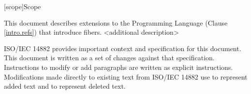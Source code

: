 
[scope]{Scope}

\pnum
This document describes extensions to the \Cpp
Programming Language (Clause \ref{intro.refs}) that introduce fibers.
<additional description>

\pnum
ISO/IEC 14882 provides important context
and specification for this document. This document is
written as a set of changes against that specification. Instructions
to modify or add paragraphs are written as explicit instructions.
Modifications made directly to existing text from ISO/IEC 14882 use  to represent added text and
 to represent deleted text.

